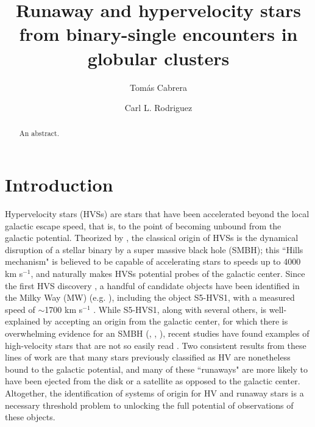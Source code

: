 \documentclass[twocolumn]{aastex631}
\begin{document}
\title{Runaway and hypervelocity stars from binary-single encounters in globular clusters}

\author[0000-0002-1270-7666]{Tom\'as Cabrera}

\author[0000-0003-4175-8881]{Carl L. Rodriguez}

\begin{abstract}
    An abstract.
\end{abstract}

\section{Introduction}
\label{sec:intro}

Hypervelocity stars (HVSs) are stars that have been accelerated beyond the local galactic escape speed, that is, to the point of becoming unbound from the galactic potential.
Theorized by \citealt{1988Natur.331..687H}, the classical origin of HVSs is the dynamical disruption of a stellar binary by a super massive black hole (SMBH); this ``Hills mechanism" is believed to be capable of accelerating stars to speeds up to 4000 km s$^{-1}$, and naturally makes HVSs potential probes of the galactic center.
Since the first HVS discovery \citep{2005ApJ...622L..33B}, a handful of candidate objects have been identified in the Milky Way (MW) (e.g. \citealt{2014ApJ...787...89B}), including the object S5-HVS1, with a measured speed of $\sim$1700 km s$^{-1}$ \citep{2020MNRAS.491.2465K}.
While S5-HVS1, along with several others, is well-explained by accepting an origin from the galactic center, for which there is overwhelming evidence for an SMBH (\citealt{1998ApJ...509..678G}, \citealt{2018A&A...615L..15G}, \citealt{2022ApJ...930L..12E}), recent studies have found examples of high-velocity stars that are not so easily read \citep[e.g.][]{2018MNRAS.479.2789B, 2019MNRAS.483.2007E, 2021A&A...646L...4I}.
Two consistent results from these lines of work are that many stars previously classified as HV are nonetheless bound to the galactic potential, and many of these ``runaways" are more likely to have been ejected from the disk or a satellite as opposed to the galactic center.
Altogether, the identification of systems of origin for HV and runaway stars is a necessary threshold problem to unlocking the full potential of observations of these objects.
\end{document}
